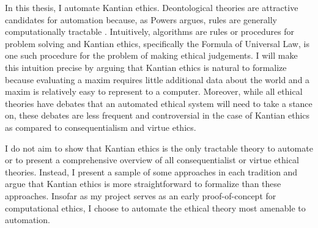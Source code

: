 %
\begin{isabellebody}%
%
%
\isadelimtheory
%
\endisadelimtheory
%
\isatagtheory
%
\endisatagtheory
{\isafoldtheory}%
%
\isadelimtheory
%
\endisadelimtheory
%
\isadelimdocument
%
\endisadelimdocument
%
\isatagdocument
%
\isamarkuptrue%
%
\endisatagdocument
{\isafolddocument}%
%
\isadelimdocument
%
\endisadelimdocument
%
\begin{isamarkuptext}%
In this thesis, I automate Kantian ethics. Deontological theories are attractive candidates for automation
because, as Powers argues, rules are generally computationally tractable \cite[1]{powers}. Intuitively, algorithms are 
rules or procedures for problem solving and Kantian ethics, specifically the Formula of Universal Law,
is one such procedure for the problem of making ethical judgements. I will make this intuition precise by
arguing that Kantian ethics is natural to formalize because evaluating a maxim requires little additional
data about the world and a maxim is relatively easy to represent to a computer. Moreover, while all 
ethical theories have debates that an automated ethical system will need to take a stance on, these debates
are less frequent and controversial in the case of Kantian ethics as compared to consequentialism and 
virtue ethics. 

I do not aim to show that Kantian ethics is the only tractable theory to automate or
to present a comprehensive overview of all consequentialist or virtue ethical theories. Instead, I 
present a sample of some approaches in each tradition and argue that Kantian ethics is more straightforward 
to formalize than these approaches. Insofar as my project serves as an early proof-of-concept for 
computational ethics, I choose to automate the ethical theory most amenable to automation.


\end{isamarkuptext}
\end{isabellebody}
